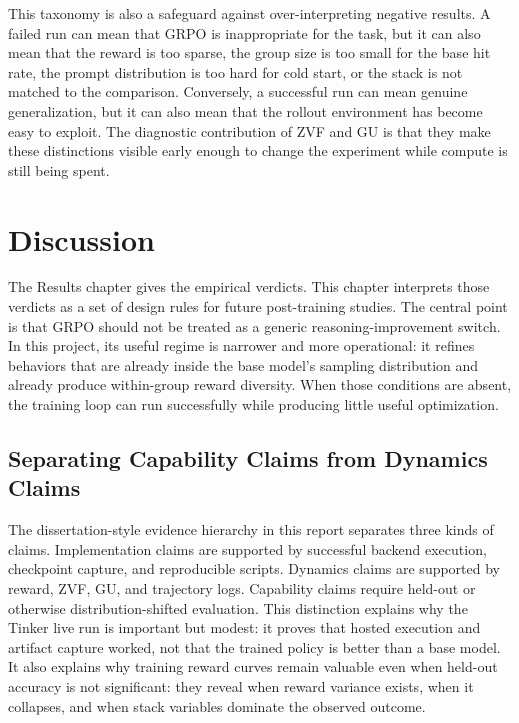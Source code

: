 \documentclass[12pt,a4paper]{report}
\begin{document}
This taxonomy is also a safeguard against over-interpreting negative results. A failed run can mean that GRPO is inappropriate for the task, but it can also mean that the reward is too sparse, the group size is too small for the base hit rate, the prompt distribution is too hard for cold start, or the stack is not matched to the comparison. Conversely, a successful run can mean genuine generalization, but it can also mean that the rollout environment has become easy to exploit. The diagnostic contribution of ZVF and GU is that they make these distinctions visible early enough to change the experiment while compute is still being spent.

\chapter{Discussion}
\label{ch:discussion}

The Results chapter gives the empirical verdicts. This chapter interprets those verdicts as a set of design rules for future post-training studies. The central point is that GRPO should not be treated as a generic reasoning-improvement switch. In this project, its useful regime is narrower and more operational: it refines behaviors that are already inside the base model's sampling distribution and already produce within-group reward diversity. When those conditions are absent, the training loop can run successfully while producing little useful optimization.

\section{Separating Capability Claims from Dynamics Claims}
\label{sec:capability-vs-dynamics}

The dissertation-style evidence hierarchy in this report separates three kinds of claims. Implementation claims are supported by successful backend execution, checkpoint capture, and reproducible scripts. Dynamics claims are supported by reward, ZVF, GU, and trajectory logs. Capability claims require held-out or otherwise distribution-shifted evaluation. This distinction explains why the Tinker live run is important but modest: it proves that hosted execution and artifact capture worked, not that the trained policy is better than a base model. It also explains why training reward curves remain valuable even when held-out accuracy is not significant: they reveal when reward variance exists, when it collapses, and when stack variables dominate the observed outcome.
\end{document}
